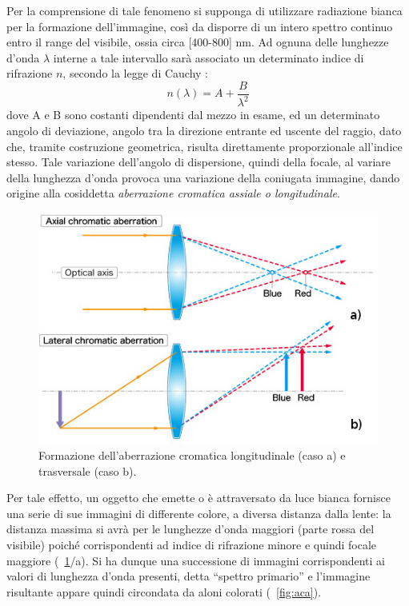Per la comprensione di tale fenomeno si supponga di utilizzare radiazione bianca per la formazione dell'immagine, così da disporre di un intero spettro continuo entro il range del visibile, ossia circa [400-800] nm. Ad ognuna delle lunghezze d'onda $\lambda$ interne a tale intervallo sarà associato un determinato indice di rifrazione $n$, secondo la legge di Cauchy \cite{nigro}:
$$n(\lambda) = A + \frac{B}{\lambda ^2}$$
dove A e B sono costanti dipendenti dal mezzo in esame, ed un determinato angolo di deviazione, angolo tra la direzione entrante ed uscente del raggio, dato che, tramite costruzione geometrica, risulta direttamente proporzionale all'indice stesso.
Tale variazione dell'angolo di dispersione, quindi della focale, al variare della lunghezza d'onda provoca una variazione della coniugata immagine, dando origine alla cosiddetta \textit{aberrazione cromatica assiale o longitudinale}. 

\begin{figure}
 \centering
 \includegraphics[scale=.50]{img/CAP2ac.jpg}
 \caption{\small{Formazione dell'aberrazione cromatica longitudinale (caso a) e trasversale (caso b).}}
 \label{fig:ac}
\end{figure}

Per tale effetto, un oggetto che emette o è attraversato da luce bianca fornisce una serie di sue immagini di differente colore, a diversa distanza dalla lente: la distanza massima si avrà per le lunghezze d'onda maggiori (parte rossa del visibile) poiché corrispondenti ad indice di rifrazione minore e quindi focale maggiore (\figurename~\ref{fig:ac}/a). 
Si ha dunque una successione di immagini corrispondenti ai valori di lunghezza d'onda presenti, detta ``spettro primario'' e l'immagine risultante appare quindi circondata da aloni colorati (\figurename~\ref{fig:aca}).

